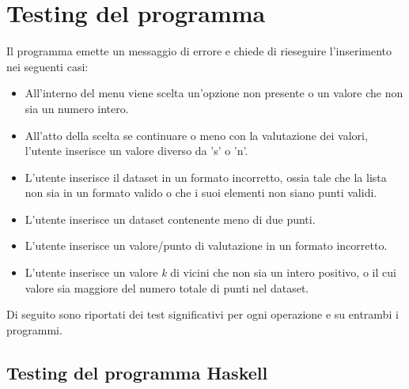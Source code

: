\documentclass[11pt]{article}
\theoremstyle{definition}
\begin{document}
\section{Testing del programma}
\normalsize
Il programma emette un messaggio di errore e chiede di rieseguire l'inserimento nei seguenti casi:
\begin{itemize}
\item All'interno del menu viene scelta un'opzione non presente o un valore che non sia un numero intero.
\item All'atto della scelta se continuare o meno con la valutazione dei valori, l'utente inserisce un valore diverso da 's' o 'n'.
\item L'utente inserisce il dataset in un formato incorretto, ossia tale che la lista non sia in un formato valido o che i suoi elementi non siano punti validi. 
\item L'utente inserisce un dataset contenente meno di due punti.
\item L'utente inserisce un valore/punto di valutazione in un formato incorretto.
\item L'utente inserisce un valore \textit{k} di vicini che non sia un intero positivo, o il cui valore sia maggiore del numero totale di punti nel dataset.
\end{itemize}
Di seguito sono riportati dei test significativi per ogni operazione e su entrambi i programmi. 

\subsection{Testing del programma Haskell}
\end{document}
